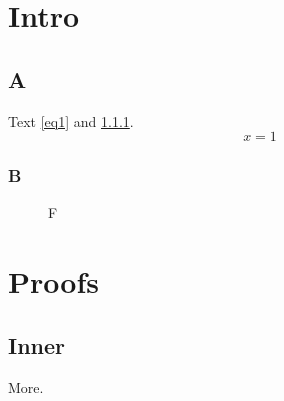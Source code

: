 \documentclass{scrreprt}
\begin{document}
\chapter{Intro}
\section{A}
Text \ref{eq1} and \ref{sb}.
\begin{equation}x=1\label{eq1}\end{equation}
\subsection{B}\label{sb}
\begin{figure}\caption{F}\end{figure}
\appendix
\chapter{Proofs}
\section{Inner}
More.
\end{document}
